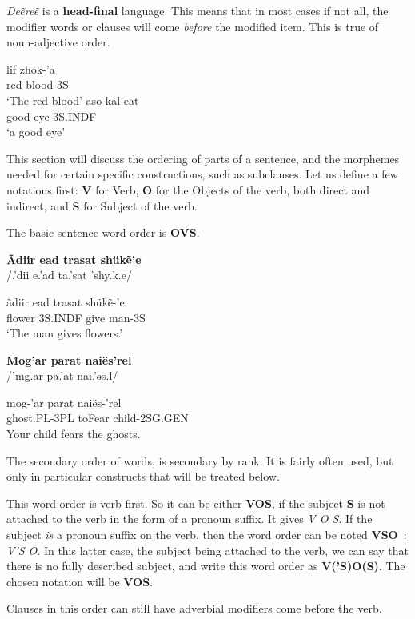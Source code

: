 \emph{Deẽreẽ} is a \textbf{head-final} language. This means that in most cases if not all, the modifier words or clauses will come \emph{before} the modified item. This is true of noun-adjective order.

\begin{exe}
\label{ex:syntax-noun}
\ex
\gll lif zhok-’a\\
red blood-3S\\
\trans ‘The red blood’
\ex
\gll aso kal eat\\
good eye 3S.INDF\\
\trans ‘a good eye’
\end{exe}

This section will discuss the ordering of parts of a sentence, and the morphemes needed for certain specific constructions, such as subclauses. Let us define a few notations first: \textbf{V} for Verb, \textbf{O} for the Objects of the verb, both direct and indirect, and \textbf{S} for Subject of the verb.

The basic sentence word order is \textbf{OVS}.

\begin{exe}
\ex\label{ex:syntax-primary-flower}
\textbf{Ãdiir ead trasat shükẽ’e}\\
/{\ipaAT}.'dii{\ipaR} e.'ad t{\ipaR}a.'sat 'shy.k{\ipaET}.e/

\gll ãdiir ead trasat shükẽ-’e\\
flower 3S.INDF give man-3S\\
\trans ‘The man gives flowers.’

\ex\label{ex:syntax-primary-ghost}
\textbf{Mog’ar parat naiës’rel}\\
/'m{\ipaO}g.ar pa.'{\ipaR}at nai.'əs.{\ipaR\ipaE}l/

\gll mog-’ar parat naiës-’rel\\
ghost.PL-3PL toFear child-2SG.GEN\\
\trans Your child fears the ghosts.
\end{exe}

The secondary order of words, is secondary by rank. It is fairly often used, but only in particular constructs that will be treated below.

This word order is verb-first. So it can be either \textbf{VOS}, if the subject \textbf{S} is not attached to the verb in the form of a pronoun suffix. It gives \emph{V O S}.
If the subject \emph{is} a pronoun suffix on the verb, then the word order can be noted \textbf{VSO} : \emph{V’S O}.
In this latter case, the subject being attached to the verb, we can say that there is no fully described subject, and write this word order as \textbf{V(’S)O(S)}.
The chosen notation will be \textbf{VOS}.

Clauses in this order can still have adverbial modifiers come before the verb.




